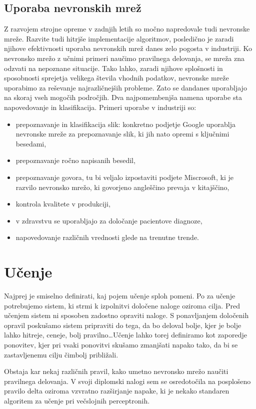 \documentclass[mat1]{fmfdelo}
\begin{document}
\subsection{Uporaba nevronskih mrež}
Z razvojem strojne opreme v zadnjih letih so močno napredovale tudi nevronske mreže. Razvite tudi hitrjše implementacije algoritmov, posledično je zaradi njihove efektivnosti uporaba nevronskih mrež danes zelo pogosta v industriji. Ko nevronsko mrežo z učnimi primeri naučimo pravilnega delovanja, se mreža zna odzvati na nepoznane situacije. Tako lahko, zaradi njihove splošnosti in sposobnosti sprejetja velikega števila vhodnih podatkov, nevronske mreže uporabimo za reševanje najrazličnejših probleme. Zato se dandanes uporabljajo na skoraj vseh mogočih področjih. Dva najpomembenjša namena uporabe sta napovedovanje in klasifikacija. Primeri uporabe v industriji so: 
\begin{itemize}
\item prepoznavanje in klasifikacija slik: konkretno podjetje Google uporablja nevronske mreže za prepoznavanje slik, ki jih nato opremi s ključnimi besedami,
\item prepoznavanje ročno napisanih besedil,
\item prepoznavanje  govora, tu bi veljalo izpostaviti podjete Miscrosoft, ki je razvilo nevronsko mrežo, ki govorjeno angleščino prevaja v kitajščino,
\item kontrola kvalitete v produkciji,
\item v zdravstvu se uporabljajo za določanje pacientove diagnoze,
\item napovedovanje različnih vrednosti glede na trenutne trende.
\end{itemize}
%
\section{Učenje}
Najprej je smiselno definirati, kaj pojem učenje sploh pomeni. Po \cite[str.~37]{kononenko} za učenje potrebujemo sistem, ki strmi k izpolnitvi določene naloge oziroma cilja. Pred učenjem sistem ni sposoben zadostno opraviti naloge. S ponavljanjem določenih opravil poskušamo sistem pripraviti do tega, da bo deloval bolje, kjer je bolje lahko hitreje, ceneje, bolj pravilno\ldots Učenje lahko torej definiramo kot zaporedje ponovitev, kjer pri vsaki ponovitvi skušamo zmanjšati napako tako, da bi se zastavljenemu cilju čimbolj približali. 

Obstaja kar nekaj različnih pravil, kako umetno nevronsko mrežo naučiti pravilnega delovanja. V svoji diplomski nalogi sem se osredotočila na posplošeno pravilo delta oziroma vzvratno razširjanje napake, ki je nekako standaren algoritem za učenje pri večslojnih perceptronih. 
%
\end{document}
